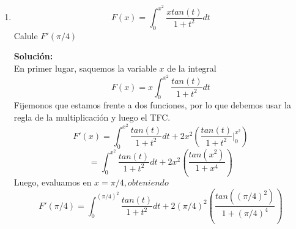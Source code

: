 \documentclass[12pt]{article}
\newenvironment{solucion}
{\begin{mdframed}[backgroundcolor=black!10]
		{\bf Solución:}\\
	}
	{
	\end{mdframed}
}
\newenvironment{preguntas}
{\begin{enumerate}\itemsep12pt
	}
	{
	\end{enumerate}
}
\newcommand{\ev}{\Big|}
\begin{document}
\begin{preguntas}
\begin{solucion}
\begin{enumerate}[a)]
\item $\displaystyle\int 2xdx = x^2 + c$
\item $\displaystyle\int e^{ln(x^2)}dx = \displaystyle\int x^2dx = \dfrac{x^3}{3} + c$
\item $\displaystyle\int 4cos(2x)dx = 2sen(2x) + c$
\item $\displaystyle\int 6e^{3x}dx = 2e^{3x} + c$
\end{enumerate}
\end{solucion}
\item $$F(x) = \displaystyle\int_0^{x^2} \dfrac{xtan(t)}{1+t^2}dt$$
	Calule $F'(\pi /4)$
\begin{solucion}
En primer lugar, saquemos la variable $x$ de la integral
		$$F(x) = x\displaystyle\int_0^{x^2} \dfrac{tan(t)}{1+t^2}dt$$
		Fijemonos que estamos frente a dos funciones, por lo que debemos usar la regla de la multiplicación y luego el TFC.
		$$F'(x) = \displaystyle\int_0^{x^2} \dfrac{tan(t)}{1+t^2}dt + 2x^2\left(\dfrac{tan(t)}{1+t^2}\ev_0^{x^2}\right)$$
		$$= \displaystyle\int_0^{x^2} \dfrac{tan(t)}{1+t^2}dt + 2x^2\left(\dfrac{tan(x^2)}{1+x^4}\right)$$
		Luego, evaluamos en $x = \pi /4, obteniendo$
		$$F'(\pi /4) = \displaystyle\int_0^{(\pi /4)^2} \dfrac{tan(t)}{1+t^2}dt + 2(\pi /4)^2\left(\dfrac{tan((\pi /4)^2)}{1+(\pi /4)^4}\right)$$
\end{solucion}
\end{preguntas}
\end{document}
